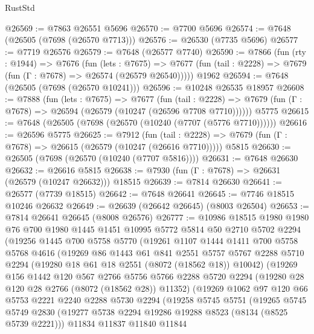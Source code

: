 \begin{lexlean}{RustStd}
\begin{coremodule}
@26569 := @7863 @26551 @5696
@26570 := @7700 @5696
@26574 := @7648 (@26505 (@7698 (@26570 @7713)))
@26576 := @26530 (@7735 @5696)
@26577 := @7719 @26576
@26579 := @7648 (@26577 @7740)
@26590 := @7866
    (fun (rty : @1944) =>
    @7676
      (fun (lets : @7675) =>
      @7677 (fun (tail : @2228) => @7679 (fun (Γ : @7678) => @26574 (@26579 @26540)))))
    @1962
@26594 := @7648 (@26505 (@7698 (@26570 @10241)))
@26596 := @10248 @26535 @18957
@26608 := @7888
    (fun (lets : @7675) =>
    @7677
      (fun (tail : @2228) =>
      @7679 (fun (Γ : @7678) => @26594 (@26579 (@10247 (@26596 @7708 @7710))))))
    @5775
@26615 := @7648 (@26505 (@7698 (@26570 (@10240 (@7707 (@5776 @7710))))))
@26616 := @26596 @5775
@26625 := @7912
    (fun (tail : @2228) => @7679 (fun (Γ : @7678) => @26615 (@26579 (@10247 (@26616 @7710)))))
    @5815
@26630 := @26505 (@7698 (@26570 (@10240 (@7707 @5816))))
@26631 := @7648 @26630
@26632 := @26616 @5815
@26638 := @7930 (fun (Γ : @7678) => @26631 (@26579 (@10247 @26632))) @18515
@26639 := @7814 @26630
@26641 := @26577 (@7739 @18515)
@26642 := @7648 @26641
@26645 := @7746 @18515 @10246 @26632
@26649 := @26639 (@26642 @26645) (@8003 @26504)
@26653 := @7814 @26641 @26645 (@8008 @26576)
@26777 := @10986
    @18515
    @1980
    @1980
    @76
    @700
    @1980
    @1445
    @1451
    @10995
    @5772
    @5814
    @50
    @2710
    @5702
    @2294
    (@19256
      @1445
      @700
      @5758
      @5770
      (@19261
        @1107
        @1444
        @1411
        @700
        @5758
        @5768
        @4616
        (@19269
          @86
          @1443
          @61
          @841
          @2551
          @5757
          @5767
          @2288
          @5710
          @2294
          (@19280 @18 @61 @18 @2551 (@8072 (@18562 @18)) @10042)
          (@19269
            @156
            @1442
            @120
            @567
            @2766
            @5756
            @5766
            @2288
            @5720
            @2294
            (@19280 @28 @120 @28 @2766 (@8072 (@18562 @28)) @11352)
            (@19269
              @1062
              @97
              @120
              @66
              @5753
              @2221
              @2240
              @2288
              @5730
              @2294
              (@19258
                @5745
                @5751
                (@19265
                  @5745
                  @5749
                  @2830
                  (@19277 @5738 @2294 @19286 @19288 @8523 (@8134 (@8525 @5739 @2221)))
                  @11834
                  @11837
                  @11840
                  @11844

\end{coremodule}
\end{lexlean}
